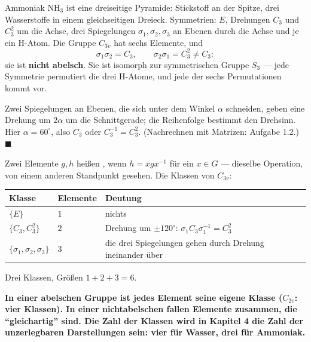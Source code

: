 \begin{merksatz}
Ammoniak $\mathrm{NH}_3$ ist eine dreiseitige Pyramide: Stickstoff an der Spitze, drei Wasserstoffe in einem gleichseitigen Dreieck. Symmetrien: $E$, Drehungen $C_3$ und $C_3^{2}$ um die Achse, drei Spiegelungen $\sigma_1, \sigma_2, \sigma_3$ an Ebenen durch die Achse und je ein H-Atom. Die Gruppe $C_{3v}$ hat sechs Elemente, und
\[ \sigma_1\sigma_2 = C_3, \qquad \sigma_2\sigma_1 = C_3^{2} \ne C_3 : \]
sie ist \textbf{nicht abelsch}. Sie ist isomorph zur symmetrischen Gruppe $S_3$ --- jede Symmetrie permutiert die drei H-Atome, und jede der sechs Permutationen kommt vor.

Zwei Spiegelungen an Ebenen, die sich unter dem Winkel $\alpha$ schneiden, geben eine Drehung um $2\alpha$ um die Schnittgerade; die Reihenfolge bestimmt den Drehsinn. Hier $\alpha = 60^{\circ}$, also $C_3$ oder $C_3^{-1} = C_3^{2}$. (Nachrechnen mit Matrizen: Aufgabe 1.2.) $\blacksquare$

Zwei Elemente $g, h$ heißen , wenn $h = xgx^{-1}$ für ein $x\in G$ --- dieselbe Operation, von einem anderen Standpunkt gesehen. Die Klassen von $C_{3v}$:
\begin{center}
{\small
\renewcommand{\arraystretch}{1.5}
\begin{tabular}{@{}P{2.0cm}P{3.4cm}P{3.2cm}@{}}
\toprule
\textbf{Klasse} & \textbf{Elemente} & \textbf{Deutung}\\
\midrule
$\{E\}$ & $1$ & nichts\\
$\{C_3, C_3^{2}\}$ & $2$ & Drehung um $\pm120^{\circ}$: $\sigma_1C_3\sigma_1^{-1} = C_3^{2}$\\
$\{\sigma_1, \sigma_2, \sigma_3\}$ & $3$ & die drei Spiegelungen gehen durch Drehung ineinander über\\
\bottomrule
\end{tabular}}
\end{center}
Drei Klassen, Größen $1 + 2 + 3 = 6$. \checkmark

\begin{center}
\begin{minipage}{0.9\textwidth}
\textbf{In einer abelschen Gruppe ist jedes Element seine eigene Klasse ($C_{2v}$: vier Klassen). In einer nichtabelschen fallen Elemente zusammen, die \enquote{gleichartig} sind. Die Zahl der Klassen wird in Kapitel 4 die Zahl der unzerlegbaren Darstellungen sein: vier für Wasser, drei für Ammoniak.}
\end{minipage}
\end{center}


\end{merksatz}
